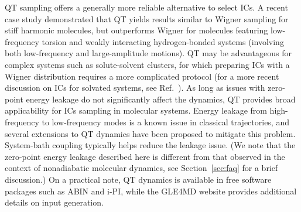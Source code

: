 \documentclass[9pt,bestpractices,pubversion]{livecoms}
\begin{document}
QT sampling offers a generally more reliable alternative to select ICs. A recent case study\cite{prlj2023deciphering}  demonstrated that QT yields results similar to Wigner sampling for stiff harmonic molecules, but outperforms Wigner for molecules featuring low-frequency torsion and weakly interacting hydrogen-bonded systems (involving both low-frequency and large-amplitude motions). QT may be advantageous for complex systems such as solute-solvent clusters, for which preparing ICs with a Wigner distribution requires a more complicated protocol \cite{ruckenbauer2010azomethane} (for a more recent discussion on ICs for solvated systems, see Ref.~). As long as issues with zero-point energy leakage do not significantly affect the dynamics, QT provides broad applicability for ICs sampling in molecular systems. Energy leakage from high-frequency to low-frequency modes is a known issue in classical trajectories, and several extensions to QT dynamics have been proposed to mitigate this problem. System-bath coupling typically helps reduce the leakage issue.\cite{Brieuc2016, Mangaud2019} (We note that the zero-point energy leakage described here is different from that observed in the context of nonadiabatic molecular dynamics, see Section~\ref{sec:faq} for a brief discussion.) On a practical note, QT dynamics is available in free software packages such as ABIN\cite{abin} and i-PI\cite{kapil2019pi}, while the GLE4MD website\cite{GLE4MDwebsite} provides additional details on input generation.
\end{document}

